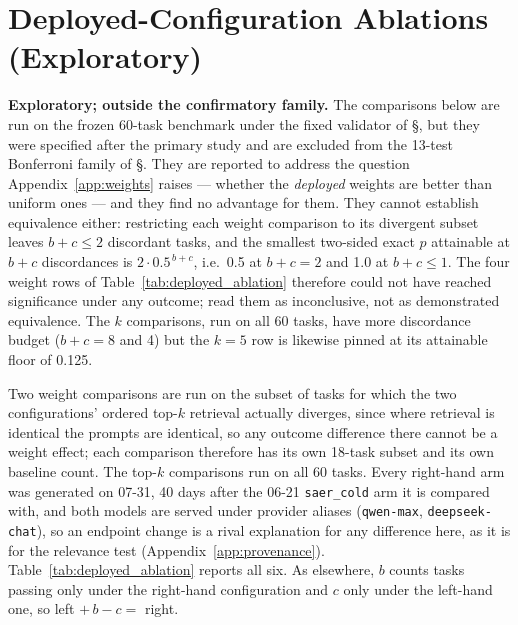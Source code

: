 \documentclass[letterpaper]{article} %
\newcommand{\appref}[1]{Appendix~\ref{#1}}
\newcommand{\bodyref}[1]{\getrefnumber{#1}}
\begin{document}
\section{Deployed-Configuration Ablations (Exploratory)}
\label{app:deployed_ablation}

\noindent\textbf{Exploratory; outside the confirmatory family.}  The
comparisons below are run on the frozen 60-task benchmark under the
fixed validator of \S\bodyref{sec:protocol}, but they were specified after the
primary study and are excluded from the 13-test Bonferroni family of
\S\bodyref{sec:protocol}.  They are reported to address the question
\appref{app:weights} raises --- whether the \emph{deployed} weights are
better than uniform ones --- and they find no advantage for them.  They
cannot establish equivalence either: restricting each weight comparison to
its divergent subset leaves $b{+}c \le 2$ discordant tasks, and the
smallest two-sided exact $p$ attainable at $b{+}c$ discordances is
$2 \cdot 0.5^{\,b+c}$, i.e.\ 0.5 at $b{+}c{=}2$ and 1.0 at $b{+}c \le 1$.
The four weight rows of Table~\ref{tab:deployed_ablation} therefore could
not have reached significance under any outcome; read them as
inconclusive, not as demonstrated equivalence.  The $k$ comparisons, run
on all 60 tasks, have more discordance budget ($b{+}c{=}8$ and 4) but the
$k{=}5$ row is likewise pinned at its attainable floor of 0.125.

Two weight comparisons are run on the subset of tasks for which the two
configurations' ordered top-$k$ retrieval actually diverges, since where
retrieval is identical the prompts are identical, so any outcome difference
there cannot be a weight effect; each comparison
therefore has its own 18-task subset and its own baseline count.  The
top-$k$ comparisons run on all 60 tasks.  Every right-hand arm was generated
on 07-31, 40 days after the 06-21 \texttt{saer\_cold} arm it is compared
with, and both models are served under provider aliases (\texttt{qwen-max},
\texttt{deepseek-chat}), so an endpoint change is a rival explanation for any
difference here, as it is for the relevance test (\appref{app:provenance}).
Table~\ref{tab:deployed_ablation} reports all six.  As elsewhere, $b$ counts
tasks passing only under the right-hand configuration and $c$ only
under the left-hand one, so left $+\,b-c=$ right.
\end{document}
